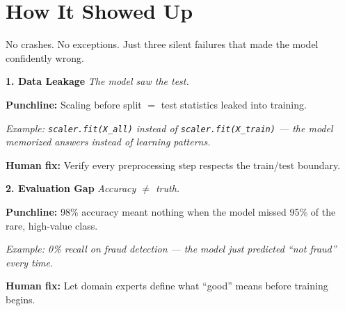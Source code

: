 \documentclass[11pt]{article}
\begin{document}
\section*{How It Showed Up}

\vspace{0.08in}

{\small No crashes. No exceptions. Just three silent failures that made the model confidently wrong.}

\vspace{0.12in}

\begin{infobox}[top=6pt, bottom=6pt, left=12pt, right=12pt]
{\normalsize\color{brandblue}\textbf{1. Data Leakage}} \hfill {\footnotesize\color{brandorange}\textit{The model saw the test.}}

\vspace{0.04in}
{\footnotesize\textbf{Punchline:} Scaling before split $=$ test statistics leaked into training.}

\vspace{0.03in}
{\footnotesize\color{brandgray}\textit{Example: \texttt{scaler.fit(X\_all)} instead of \texttt{scaler.fit(X\_train)} — the model memorized answers instead of learning patterns.}}

\vspace{0.03in}
{\footnotesize\color{brandred}\textbf{Human fix:} Verify every preprocessing step respects the train/test boundary.}
\end{infobox}

\vspace{0.08in}

\begin{infobox}[top=6pt, bottom=6pt, left=12pt, right=12pt]
{\normalsize\color{brandblue}\textbf{2. Evaluation Gap}} \hfill {\footnotesize\color{brandorange}\textit{Accuracy $\neq$ truth.}}

\vspace{0.04in}
{\footnotesize\textbf{Punchline:} 98\% accuracy meant nothing when the model missed 95\% of the rare, high-value class.}

\vspace{0.03in}
{\footnotesize\color{brandgray}\textit{Example: 0\% recall on fraud detection — the model just predicted ``not fraud'' every time.}}

\vspace{0.03in}
{\footnotesize\color{brandred}\textbf{Human fix:} Let domain experts define what ``good'' means before training begins.}
\end{infobox}
\end{document}
